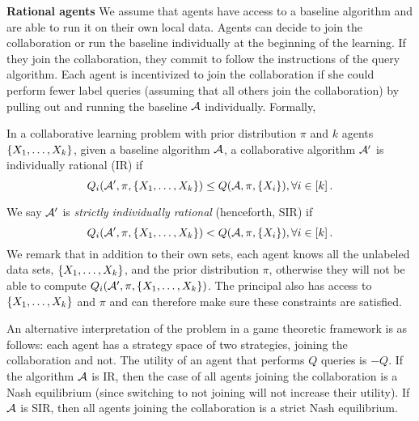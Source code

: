 \textbf{Rational agents}
We assume that agents have access to a baseline algorithm and are able to run it on their own local data. 
Agents can decide to join the collaboration or run the baseline individually at the beginning of the learning.
If they join the collaboration, they commit to follow the instructions of the query algorithm. 
Each agent is incentivized to join the collaboration if she could perform fewer label queries (assuming that all others join the collaboration) by pulling out and running the baseline $\mathcal{A}$ individually. 
Formally, 
\begin{definition}
    In a collaborative learning problem with prior distribution $\pi$ and $k$ agents $\{X_1,\ldots,X_k\}$, given a baseline algorithm $\mathcal{A}$,
    a collaborative algorithm $\mathcal{A}'$ is individually rational (IR) if 
\begin{equation}
    {Q_i(\mathcal{A}',\pi, \{X_1,\ldots,X_k\})} \leq Q(\mathcal{A}, \pi, \{X_i\}), \forall i\in [k]\,.\label{eq:def-incentive}
\end{equation}
\end{definition}
We say 
 $\mathcal{A}'$ is \textit{strictly individually rational} (henceforth, SIR) if
\begin{equation*}
    {Q_i(\mathcal{A}',\pi, \{X_1,\ldots,X_k\})} < Q(\mathcal{A}, \pi, \{X_i\}), \forall i\in [k]\,.
\end{equation*}
We remark that in addition to their own sets, each agent knows all the unlabeled data sets,  $\{X_1,\ldots,X_k\}$, and the prior distribution $\pi$, otherwise they will not be able to compute $Q_i(\mathcal{A}',\pi,\{X_1,\ldots,X_k\})$. The principal also has access to $\{X_1,\ldots,X_k\}$ and $\pi$ and can therefore make sure these constraints are satisfied. 




An alternative interpretation of the problem in a game theoretic framework is as follows: each agent has a strategy space of two strategies, joining the collaboration and not.
The utility of an agent that performs $Q$ queries is $-Q$.
If the algorithm $\mathcal{A}$ is IR, then the case of all agents joining the collaboration is a Nash equilibrium (since switching to not joining will not increase their utility).
If $\mathcal{A}$ is SIR, then all agents joining the collaboration is a strict Nash equilibrium.



